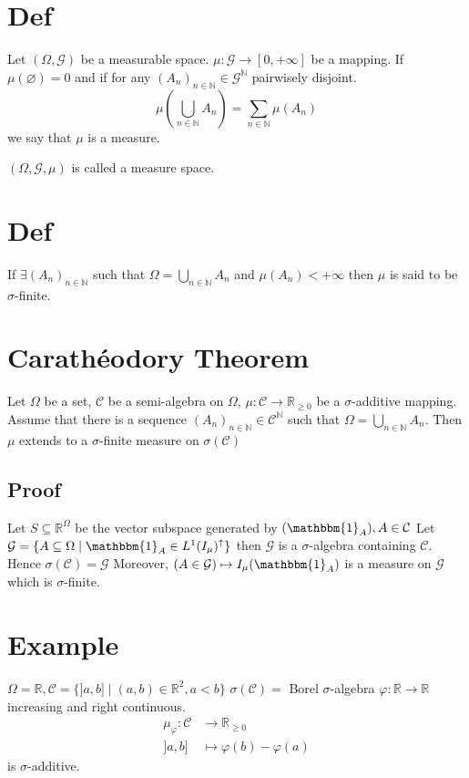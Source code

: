 \documentclass{book}
\newcommand{\rightbracket}{]}
\begin{document}
\section{Def}
Let $(\Omega,\mathcal{G})$ be a measurable space. $\mu:\mathcal{G}\rightarrow[0,+\infty]$ be a mapping. If $\mu(\varnothing)=0$ and if for any $(A_n)_{n\in\mathbb{N}}\in \mathcal{G}^\mathbb{N}$ pairwisely disjoint.
$$\mu(\bigcup\limits_{n\in \mathbb{N}}A_n)=\sum\limits_{n\in \mathbb{N}}\mu(A_n)$$we say that $\mu$ is a measure.

$(\Omega,\mathcal{G},\mu)$ is called a measure space.
\section{Def}
If $\exists(A_n)_{n\in \mathbb{N}}$ such that $\Omega=\bigcup\limits_{n\in \mathbb{N}}A_n$ and $\mu(A_n)<+\infty$ then $\mu$ is said to be $\sigma$-finite.
\section{Carathéodory Theorem}
Let $\Omega$ be a set, $\mathcal{C}$ be a semi-algebra on $\Omega$, $\mu:\mathcal{C}\rightarrow\mathbb{R}_{\geq0}$ be a $\sigma$-additive mapping. Assume that there is a sequence $(A_n)_{n\in \mathbb{N}}\in \mathcal{C}^\mathbb{N}$ such that $\Omega=\bigcup\limits_{n\in \mathbb{N}}A_n$. Then $\mu$ extends to a $\sigma$-finite measure on $\sigma(\mathcal{C})$
\subsection*{Proof}
Let $S\subseteq\mathbb{R}^\Omega$ be the vector subspace generated by $(\mathbbm{1}_A),A\in \mathcal{C}$ Let $\mathcal{G}=\{A\subseteq\Omega\mid\mathbbm{1}_A\in L^1(I_\mu)^\uparrow\}$ then $\mathcal{G}$ is a $\sigma$-algebra containing $\mathcal{C}$. Hence $\sigma(\mathcal{C})=\mathcal{G}$ Moreover, $(A\in \mathcal{G})\mapsto I_\mu(\mathbbm{1}_A)$ is a measure on $\mathcal{G}$ which is $\sigma$-finite.
\section{Example}
$\Omega=\mathbb{R}, \mathcal{C}=\{\rightbracket a,b\rightbracket\mid (a,b)\in \mathbb{R}^2,a<b\}$ $\sigma(\mathcal{C})=$ Borel $\sigma$-algebra $\varphi:\mathbb{R}\rightarrow\mathbb{R}$ increasing and right continuous.
$$\begin{aligned}
    \mu_\varphi:\mathcal{C}&\rightarrow\mathbb{R}_{\geq0}\\ \rightbracket a,b\rightbracket&\mapsto \varphi(b)-\varphi(a)
\end{aligned}$$is $\sigma$-additive.
\end{document}
